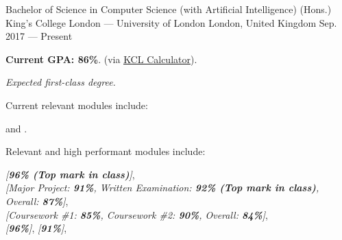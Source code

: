 

\begin{cventries}

    \cventry
    {Bachelor of Science in Computer Science (with Artificial Intelligence) (Hons.)} %
    {King’s College London --- University of London} %
    {London, United Kingdom} %
    {Sep. 2017 --- Present} %
    {
        \begin{cvitems} %
            \item {\textbf{Current GPA: 86\%}. (via \href{https://www.kcl.ac.uk/campuslife/acservices/Academic-Regulations/assets-17-18/Award-calculator-guidance.pdf}{\uline{KCL Calculator}}}).
            \item {\textit{Expected first-class degree.}}
            \item {Current relevant modules include:
                        \begin{flushleft}
                             and .
                        \end{flushleft}
                  }
            \item {Relevant and high performant modules include:
                        \begin{flushleft}
                             \textit{[\textbf{96\% (Top mark in class)}]},\\
                             \textit{[Major Project: \textbf{91\%}, Written Examination: \textbf{92\% (Top mark in class)}, Overall: \textbf{87\%}]},\\
                             \textit{[Coursework \#1: \textbf{85\%}, Coursework \#2: \textbf{90\%}, Overall: \textbf{84\%}]},\\
                             \textit{[\textbf{96\%}]},
                             \textit{[\textbf{91\%}]}, \\

\end{flushleft}}
\end{cvitems}}
\end{cventries}

